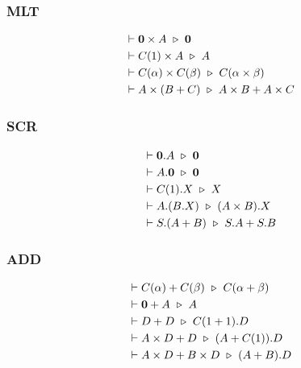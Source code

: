 \subsubsection*{\textsf{MLT}}
\begin{align*}
  & \vdash \mathbf{0} \times A \ \triangleright\  \mathbf{0} \\
  & \vdash C(1) \times A \ \triangleright\  A \\
  & \vdash C(\alpha) \times C(\beta) \ \triangleright\  C(\alpha \times \beta) \\
  & \vdash A \times (B + C) \ \triangleright\  A \times B + A \times C
\end{align*}

\subsubsection*{\textsf{SCR}}
\begin{align*}
    & \vdash \mathbf{0} . A \ \triangleright\  \mathbf{0} \\
    & \vdash A.\mathbf{0} \ \triangleright\  \mathbf{0} \\
    & \vdash C(1).X \ \triangleright\  X \\
    & \vdash A.(B.X) \ \triangleright\  (A \times B).X \\
    & \vdash S.(A + B) \ \triangleright\  S.A + S.B
\end{align*}

\subsubsection*{\textsf{ADD}}
\begin{align*}
    & \vdash C(\alpha) + C(\beta) \ \triangleright\  C(\alpha + \beta) \\
    & \vdash \mathbf{0} + A \ \triangleright\  A \\
    & \vdash D + D \ \triangleright\  C(1 + 1).D \\
    & \vdash A \times D + D \ \triangleright\  (A + C(1)).D \\
    & \vdash A \times D + B \times D \ \triangleright\  (A + B).D \\
\end{align*}

